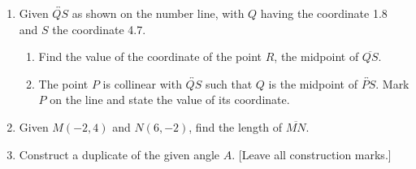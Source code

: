 \begin{enumerate}
\item Given $\overleftrightarrow{QS}$ as shown on the number line, with $Q$ having the coordinate 1.8 and $S$ the coordinate 4.7. \\[6pt] %
 \bigskip
\begin{enumerate}
  \item Find the value of the coordinate of the point $R$, the midpoint of $\overline{QS}$. \vspace{3cm}
  \item The point $P$ is collinear with $\overleftrightarrow{QS}$ such that $Q$ is the midpoint of $\overleftrightarrow{PS}$. Mark $P$ on the line and state the value of its coordinate.
\end{enumerate} %

\newpage

\item Given $M(-2,4)$ and $N(6,-2)$, find the length of $\overline{MN}$.
  \vspace{6cm}

\item Construct a duplicate of the given angle $A$.  [Leave all construction marks.]\\[3cm]

\newpage


\end{enumerate}

